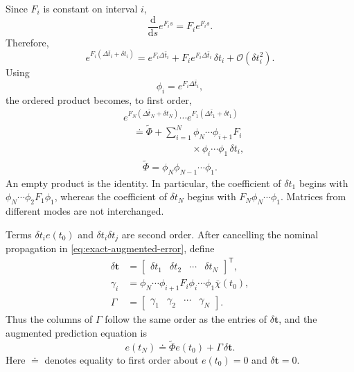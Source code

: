 \documentclass[pdflatex,iicol,sn-mathphys-ay]{sn-jnl}
\begin{document}
Since $F_i$ is constant on interval $i$,
\begin{equation}
    \frac{\mathrm d}{\mathrm ds}e^{F_i s}=F_i e^{F_i s}.
\end{equation}
Therefore,
\begin{equation}
    e^{F_i(\Delta\bar t_i+\delta t_i)}
    =e^{F_i\Delta\bar t_i}
    +F_i e^{F_i\Delta\bar t_i}\,\delta t_i
    +\mathcal O(\delta t_i^2).
    \label{eq:interval-first-order}
\end{equation}
Using
\begin{equation}
    \phi_i=e^{F_i\Delta\bar t_i},
\end{equation}
the ordered product becomes, to first order,
\begin{equation}
\begin{split}
    &e^{F_N(\Delta\bar t_N+\delta t_N)}\cdots
     e^{F_1(\Delta\bar t_1+\delta t_1)}\\
    &\quad\doteq \widetilde\Phi+
    \sum_{i=1}^{N}\phi_N\cdots\phi_{i+1}F_i\\
    &\hspace{7em}{}\times\phi_i\cdots\phi_1\,\delta t_i,\\
    &\qquad \widetilde\Phi=\phi_N\phi_{N-1}\cdots\phi_1.
\end{split}
\label{eq:ordered-product-first-order}
\end{equation}
An empty product is the identity. In particular, the coefficient of $\delta t_1$ begins with $\phi_N\cdots\phi_2F_1\phi_1$, whereas the coefficient of $\delta t_N$ begins with $F_N\phi_N\cdots\phi_1$. Matrices from different modes are not interchanged.

Terms $\delta t_i e(t_0)$ and $\delta t_i\delta t_j$ are second order. After cancelling the nominal propagation in \eqref{eq:exact-augmented-error}, define
\begin{equation}
\begin{aligned}
    \delta\boldsymbol{t}
    &=\begin{bmatrix}\delta t_1&\delta t_2&\cdots&\delta t_N\end{bmatrix}^{\mathsf T},\\
    \gamma_i
    &=\phi_N\cdots\phi_{i+1}F_i\phi_i\cdots\phi_1\bar\chi(t_0),\\
    \Gamma&=\begin{bmatrix}\gamma_1&\gamma_2&\cdots&\gamma_N\end{bmatrix}.
\end{aligned}
\label{eq:augmented-dwell-sensitivity}
\end{equation}
Thus the columns of $\Gamma$ follow the same order as the entries of $\delta\boldsymbol{t}$, and the augmented prediction equation is
\begin{equation}
    \boxed{e(t_N)\doteq\widetilde\Phi e(t_0)+\Gamma\,\delta\boldsymbol{t}}.
    \label{eq:augmented-prediction}
\end{equation}
Here $\doteq$ denotes equality to first order about $e(t_0)=0$ and $\delta\boldsymbol{t}=0$.
\end{document}

